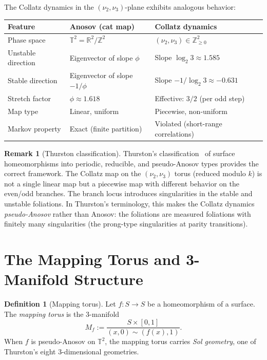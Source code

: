\documentclass[11pt,a4paper]{article}
\newcommand{\Z}{\mathbb{Z}}
\newcommand{\R}{\mathbb{R}}
\newcommand{\T}{\mathbb{T}}
\theoremstyle{plain}
\theoremstyle{definition}
\newtheorem{definition}[theorem]{Definition}
\newtheorem{remark}[theorem]{Remark}
\begin{document}
The Collatz dynamics in the $(\nu_2, \nu_3)$-plane exhibits analogous behavior:
\begin{center}
    \renewcommand{\arraystretch}{1.3}
    \begin{tabular}{lll}
        \toprule
        \textbf{Feature} & \textbf{Anosov (cat map)} & \textbf{Collatz dynamics} \\
        \midrule
        Phase space & $\T^2 = \R^2/\Z^2$ & $(\nu_2, \nu_3) \in \Z_{\geq 0}^2$ \\
        Unstable direction & Eigenvector of slope $\phi$ & Slope $\log_2 3 \approx 1.585$ \\
        Stable direction & Eigenvector of slope $-1/\phi$ & Slope $-1/\log_2 3 \approx -0.631$ \\
        Stretch factor & $\phi \approx 1.618$ & Effective: $3/2$ (per odd step) \\
        Map type & Linear, uniform & Piecewise, non-uniform \\
        Markov property & Exact (finite partition) & Violated (short-range correlations) \\
        \bottomrule
    \end{tabular}
\end{center}

\begin{remark}[Thurston classification]
    Thurston's classification~\cite{Thurston1988} of surface homeomorphisms into periodic, reducible, and pseudo-Anosov types provides the correct framework. The Collatz map on the $(\nu_2, \nu_3)$ torus (reduced modulo $k$) is not a single linear map but a piecewise map with different behavior on the even/odd branches. The branch locus introduces singularities in the stable and unstable foliations. In Thurston's terminology, this makes the Collatz dynamics \emph{pseudo-Anosov} rather than Anosov: the foliations are measured foliations with finitely many singularities (the prong-type singularities at parity transitions).
\end{remark}


\section{The Mapping Torus and 3-Manifold Structure}\label{sec:mapping-torus}

\begin{definition}[Mapping torus]
    Let $f: S \to S$ be a homeomorphism of a surface. The \emph{mapping torus} is the 3-manifold
    \begin{equation}
        M_f := \frac{S \times [0,1]}{(x, 0) \sim (f(x), 1)}.
    \end{equation}
    When $f$ is pseudo-Anosov on $\T^2$, the mapping torus carries \emph{Sol geometry}, one of Thurston's eight 3-dimensional geometries.
\end{definition}
\end{document}
